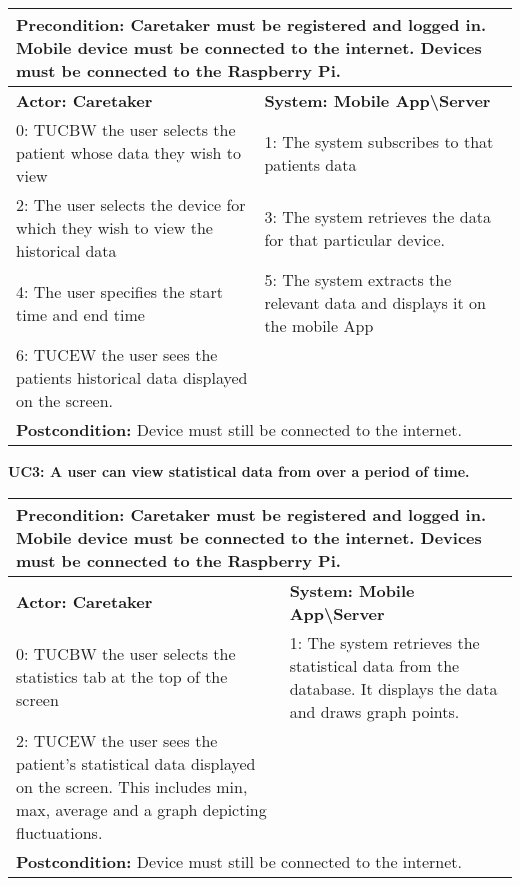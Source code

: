			\begin{flushleft}
					\begin{tabular}{ |p{7cm}|p{7cm}| }
   						\hline
  						\multicolumn{2}{|p{\textwidth}|}{\textbf{Precondition:} Caretaker must be registered and logged in. Mobile device must be connected to the internet. Devices must be connected to the Raspberry Pi.} \\
 						\hline
						\textbf {Actor: Caretaker} & \textbf{System: Mobile App\textbackslash Server}\\
						\hline
						 0: TUCBW the user selects the patient whose data they wish to view & 1: The system subscribes to that patients data\\
						\hline
						2: The user selects the device for which they wish to view the historical data & 3: The system retrieves the data for that particular device.\\
						\hline
						4: The user specifies the start time and end time & 5: The system extracts the relevant data and displays it on the mobile App\\
						\hline
						6: TUCEW the user sees the patients historical data displayed on the screen. & \\
  						\hline
  						\multicolumn{2}{|p{\textwidth}|}{\textbf{Postcondition:} Device must still be connected to the internet.} \\
  						\hline

				\end{tabular}

			\end{flushleft}


			
			
			
\noindent\textbf{UC3: A user can view statistical data from over a period of time. }
				\begin{flushleft}
					\begin{tabular}{ |p{7cm}|p{7cm}| }
   						\hline
  						\multicolumn{2}{|p{\textwidth}|}{\textbf{Precondition:} Caretaker must be registered and logged in. Mobile device must be connected to the internet. Devices must be connected to the Raspberry Pi.} \\
 						\hline
						\textbf {Actor: Caretaker} & \textbf{System: Mobile App\textbackslash Server}\\
						\hline
						  0: TUCBW the user selects the statistics tab at the top of the screen & 1: The system retrieves the statistical data from the database. It displays the data and draws graph points.\\
						\hline
						2: TUCEW the user sees the patient's statistical data displayed on the screen. This includes min, max, average and a graph depicting fluctuations. & \\
  						\hline
  						\multicolumn{2}{|p{\textwidth}|}{\textbf{Postcondition:} Device must still be connected to the internet.} \\
  						\hline

				\end{tabular}

			\end{flushleft}
